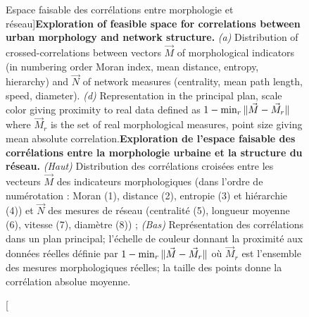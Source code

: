 \begin{figure}
\caption[Exploration of feasible space for correlations between urban morphology and network structure][Espace faisable des corrélations entre morphologie et réseau]{\textbf{Exploration of feasible space for correlations between urban morphology and network structure.} \textit{(a)} Distribution of crossed-correlations between vectors $\vec{M}$ of morphological indicators (in numbering order Moran index, mean distance, entropy, hierarchy) and $\vec{N}$ of network measures (centrality, mean path length, speed, diameter). \textit{(d)} Representation in the principal plan, scale color giving proximity to real data defined as $1 - \min_r \| \vec{M}-\vec{M}_r \|$ where $\vec{M}_r$ is the set of real morphological measures, point size giving mean absolute correlation.\label{fig:correlatedsyntheticdata:densnwcor}}{\textbf{Exploration de l'espace faisable des corrélations entre la morphologie urbaine et la structure du réseau.} \textit{(Haut)} Distribution des corrélations croisées entre les vecteurs $\vec{M}$ des indicateurs morphologiques (dans l'ordre de numérotation : Moran (1), distance (2), entropie (3) et hiérarchie (4)) et $\vec{N}$ des mesures de réseau (centralité (5), longueur moyenne (6), vitesse (7), diamètre (8)) ; \textit{(Bas)} Représentation des corrélations dans un plan principal; l'échelle de couleur donnant la proximité aux données réelles définie par $1 - \min_r \| \vec{M}-\vec{M}_r \|$ où $\vec{M}_r$ est l'ensemble des mesures morphologiques réelles; la taille des points donne la corrélation absolue moyenne.\label{fig:correlatedsyntheticdata:densnwcor}}
\end{figure}


